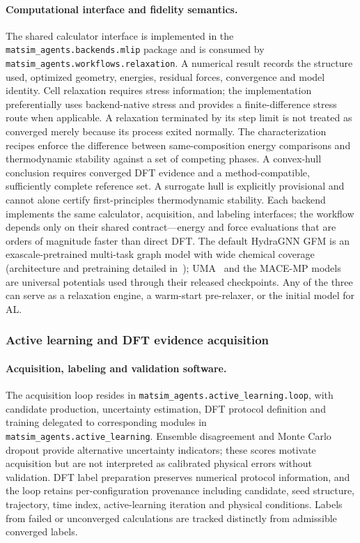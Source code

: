 \documentclass[11pt,a4paper]{article}
\def\ac#1{#1}%
\begin{document}
\paragraph{Computational interface and fidelity semantics.}
The shared calculator interface is implemented in the \texttt{matsim\_agents.backends.mlip} package and is consumed by \texttt{matsim\_agents.workflows.relaxation}. A numerical result records the structure used, optimized geometry, energies, residual forces, convergence and model identity. Cell relaxation requires stress information; the implementation preferentially uses backend-native stress and provides a finite-difference stress route when applicable. A relaxation terminated by its step limit is not treated as converged merely because its process exited normally. The characterization recipes enforce the difference between same-composition energy comparisons and thermodynamic stability against a set of competing phases. A convex-hull conclusion requires converged \ac{DFT} evidence and a method-compatible, sufficiently complete reference set. A surrogate hull is explicitly provisional and cannot alone certify first-principles thermodynamic stability.
Each backend implements the same calculator, acquisition, and labeling
interfaces; the workflow depends only on their shared contract---energy and force
evaluations that are orders of magnitude faster than direct \ac{DFT}. The default HydraGNN
\ac{GFM} is an exascale-pretrained multi-task graph model with wide chemical
coverage (architecture and pretraining detailed
in~\cite{lupopasini2026exascalegfm}); UMA~\cite{wood2025uma} and the MACE-MP
models~\cite{batatia2022,batatia2023macemp} are universal potentials used through
their released checkpoints. Any of the three can serve as a relaxation engine,
a warm-start pre-relaxer, or the initial model for \ac{AL}.

\subsubsection{Active learning and DFT evidence acquisition}

\paragraph{Acquisition, labeling and validation software.}
The acquisition loop resides in \texttt{matsim\_agents.active\_learning.loop}, with candidate production, uncertainty estimation, \ac{DFT} protocol definition and training delegated to corresponding modules in \texttt{matsim\_agents.active\_learning}. Ensemble disagreement and Monte Carlo dropout provide alternative uncertainty indicators; these scores motivate acquisition but are not interpreted as calibrated physical errors without validation. DFT label preparation preserves numerical protocol information, and the loop retains per-configuration provenance including candidate, seed structure, trajectory, time index, active-learning iteration and physical conditions. Labels from failed or unconverged calculations are tracked distinctly from admissible converged labels.
\end{document}
